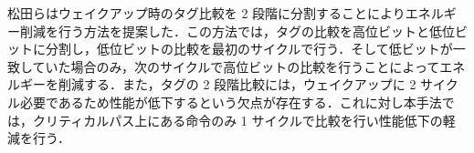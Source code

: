 松田らはウェイクアップ時のタグ比較を 2 段階に分割することによりエネルギー削減を行う方法を提案した\cite{kobayashi-thesis, matsuda-thesis}．この方法では，タグの比較を高位ビットと低位ビットに分割し，低位ビットの比較を最初のサイクルで行う．そして低ビットが一致していた場合のみ，次のサイクルで高位ビットの比較を行うことによってエネルギーを削減する．また，タグの 2 段階比較には，ウェイクアップに 2 サイクル必要であるため性能が低下するという欠点が存在する．これに対し本手法では，クリティカルパス上にある命令のみ 1 サイクルで比較を行い性能低下の軽減を行う．

